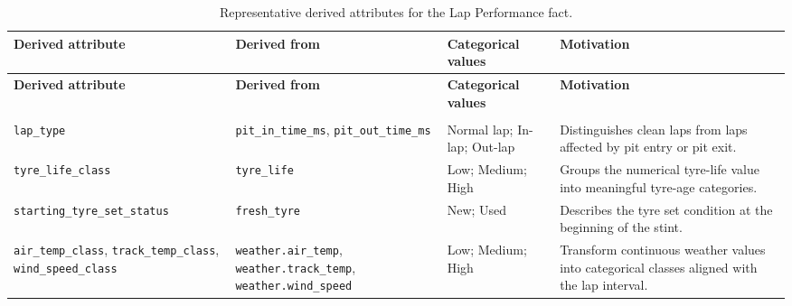 \documentclass[11pt,a4paper]{article}
\begin{document}
	{\footnotesize
		\renewcommand{\arraystretch}{1.15}
		
		\begin{longtable}{
				>{\raggedright\arraybackslash}p{3.2cm}
				>{\raggedright\arraybackslash}p{3.0cm}
				>{\raggedright\arraybackslash}p{2.8cm}
				>{\raggedright\arraybackslash}p{6.5cm}
			}
			\caption{Representative derived attributes for the Lap Performance fact.}
			\label{tab:lap-derived-representative} \\
			
			\toprule
			\textbf{Derived attribute}
			& \textbf{Derived from}
			& \textbf{Categorical values}
			& \textbf{Motivation} \\
			\midrule
			\endfirsthead
			
			\toprule
			\textbf{Derived attribute}
			& \textbf{Derived from}
			& \textbf{Categorical values}
			& \textbf{Motivation} \\
			\midrule
			\endhead
			
			\midrule
			\multicolumn{4}{r}{\emph{Continued on next page}} \\
			\endfoot
			
			\bottomrule
			\endlastfoot
			
			\texttt{lap\_type}
			& \texttt{pit\_in\_time\_ms}, \texttt{pit\_out\_time\_ms}
			& Normal lap; In-lap; Out-lap
			& Distinguishes clean laps from laps affected by pit entry or pit exit. \\
			
			\midrule
			
			\texttt{tyre\_life\_class}
			& \texttt{tyre\_life}
			& Low; Medium; High
			& Groups the numerical tyre-life value into meaningful tyre-age categories. \\
			
			\midrule
			
			{\scriptsize\texttt{starting\_tyre\_set\_status}}
			& \texttt{fresh\_tyre}
			& New; Used
			& Describes the tyre set condition at the beginning of the stint. \\
			
			\midrule
			
			{\scriptsize\texttt{air\_temp\_class}, \texttt{track\_temp\_class}, \texttt{wind\_speed\_class}}
			& \texttt{weather.air\_temp}, \texttt{weather.track\_temp}, \texttt{weather.wind\_speed}
			& Low; Medium; High
			& Transform continuous weather values into categorical classes aligned with the lap interval. \\
			
			\midrule
			

\end{longtable}}
\end{document}
